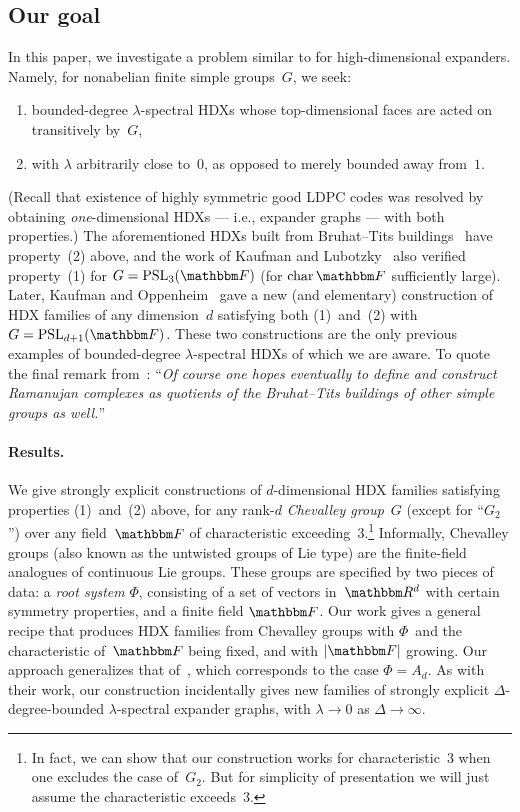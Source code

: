 \documentclass[10pt,a4paper]{article}
\theoremstyle{definition}
\newcommand{\chr}{\operatorname{char}}
\newcommand{\R}{\mathbbm R}
\newcommand{\F}{\mathbbm F}
\newcommand{\rnote}[1]{}
\newcommand{\PSL}{{\mathrm{PSL}}}
\begin{document}
\subsection{Our goal}   \label{sec:goal}
In this paper, we investigate a problem similar to  for high-dimensional expanders.
Namely, for nonabelian finite simple groups~$G$, we seek:
\begin{enumerate}
    \item bounded-degree $\lambda$-spectral HDXs whose top-dimensional faces are acted on transitively by~$G$,
    \item with $\lambda$ arbitrarily close to~$0$, as opposed to merely bounded away from~$1$.
\end{enumerate}
(Recall that existence of highly symmetric good LDPC codes was resolved by obtaining \emph{one}-dimensional HDXs --- i.e., expander graphs --- with both properties.)
The aforementioned HDXs built from Bruhat--Tits buildings~\cite{Li04,LSV05,LSV05b,Sar04} have property~(2) above, and the work of Kaufman and Lubotzky~\cite{KL12} also verified property~(1) for $G = \PSL_3(\F)$ (for  $\chr \F$ sufficiently large).
Later, Kaufman and Oppenheim~\cite{KO18} gave a new (and elementary) construction of HDX families of any dimension~$d$ satisfying both (1)~and~(2) with $G = \PSL_{d+1}(\F)$.
These two constructions are the only previous examples of bounded-degree $\lambda$-spectral HDXs of which we are aware.  To quote the final remark from~\cite{LSV05}: ``\emph{Of course one hopes eventually to define and construct Ramanujan complexes as quotients of the Bruhat--Tits buildings of other simple groups as well.}''

\paragraph{Results.}
We give strongly explicit constructions of $d$-dimensional HDX families satisfying properties (1)~and~(2) above, for any rank-$d$ \emph{Chevalley group}~$G$ (except for ``$G_2$'') over any field~$\F$ of characteristic exceeding~$3$.\footnote{In fact, we can show that our construction works for characteristic~$3$ when one excludes the case of~$G_2$.  But for simplicity of presentation we will just assume the characteristic exceeds~$3$.\label{foot:5}}
Informally, Chevalley groups (also known as the untwisted groups of Lie type) are the finite-field analogues of continuous Lie groups.
These groups are specified by two pieces of data: a \emph{root system} $\Phi$, consisting of a set of vectors in~$\R^d$ with certain symmetry properties, and a finite field $\F$.
Our work gives a general recipe that produces HDX families from Chevalley groups with $\Phi$~and the characteristic of~$\F$ being fixed, and with $|\F|$ growing.
Our approach generalizes that of~\cite{KO18}, which corresponds to the case $\Phi = A_d$.
As with their work, our construction incidentally gives new families of strongly explicit $\Delta$-degree-bounded $\lambda$-spectral expander graphs, with $\lambda \to 0$ as $\Delta \to \infty$.\rnote{Some comments about graphs of constant link?}
\end{document}
